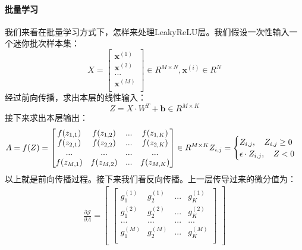 \documentclass[UTF8]{article}
\begin{document}
\paragraph{批量学习}
我们来看在批量学习方式下，怎样来处理LeakyReLU层。我们假设一次性输入一个迷你批次样本集：
\begin{equation}
X=\begin{bmatrix}
\boldsymbol{x}^{(1)} \\
\boldsymbol{x}^{(2)} \\
... \\
\boldsymbol{x}^{(M)} \\
\end{bmatrix} \in R^{M \times N}, \boldsymbol{x}^{(i)} \in R^{N}
\label{mlp-leaky-relu-X-def}
\end{equation}
经过前向传播，求出本层的线性输入：
\begin{equation}
Z=X \cdot W^{T} + \boldsymbol{b} \in R^{M \times K}
\label{mlp-leaky-relu-Z-def}
\end{equation}
接下来求出本层输出：
\begin{equation}
A=f(Z)=\begin{bmatrix}
f(z_{1,1}) & f(z_{1,2}) & ... & f(z_{1,K}) \\
f(z_{2,1}) & f(z_{2,2}) & ... & f(z_{2,K}) \\
... & ... & ... & ... \\
f(z_{M,1}) & f(z_{M,2}) & ... & f(z_{M,K}) \\
\end{bmatrix} \in R^{M \times K} \\
Z_{i,j}=\begin{cases}
Z_{i,j}, \quad Z_{i,j} \ge 0 \\
\epsilon \cdot Z_{i,j}, \quad Z < 0
\end{cases}
\label{mlp-leaky-relu-Y-def}
\end{equation}
以上就是前向传播过程。接下来我们看反向传播。上一层传导过来的微分值为：
\begin{equation}
\begin{aligned}
\frac{\partial{\mathcal{J}}}{\partial{A}}=\begin{bmatrix}
\begin{bmatrix}
g_{1}^{(1)} & g_{2}^{(1)} & ... & g_{K}^{(1)} \\
g_{1}^{(2)} & g_{2}^{(2)} & ... & g_{K}^{(2)} \\
... & ... & ... & ... \\
g_{1}^{(M)} & g_{2}^{(M)} & ... & g_{K}^{(M)} \\
\end{bmatrix}
\end{bmatrix}
\end{aligned}
\label{mlp-leaky-relu-pJ-pA-def}
\end{equation}
\end{document}
